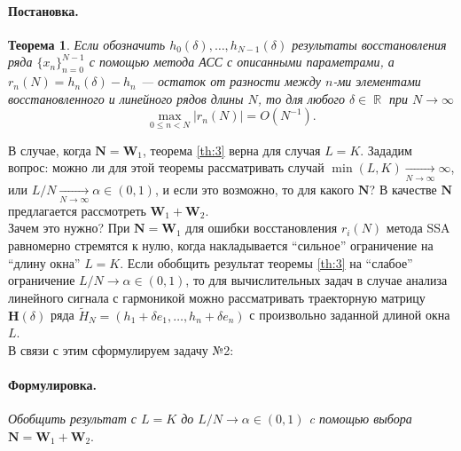 \documentclass[specialist,
substylefile = spbu_report.rtx,
subf,href,colorlinks=true, 12pt]{disser}
\DeclareMathOperator\R{\mathbb{R}}
\newtheorem{theorem}{Теорема}
\newenvironment{formulation}{\paragraph{Формулировка.}}{\hfill}
\newenvironment{statement}{\paragraph{Постановка.}}{\hfill}
\begin{document}
\begin{statement}
\begin{theorem}
			Если обозначить $h_0(\delta),\dots, h_{N-1}(\delta)$ результаты восстановления ряда $\{x_n\}^{N-1}_{n=0}$ с помощью метода АСС с описанными параметрами, а $r_n(N)=h_n(\delta)-h_n$ --- остаток от разности между $n$-ми элементами восстановленного и линейного рядов длины $N$, то для любого $\delta\in\R$ при $N\rightarrow\infty$
			\begin{equation*}
				\max_{0\leqslant n<N}|r_n(N)|=O(N^{-1}).
			\end{equation*}
		\end{theorem}
		В случае, когда $\mathbf{N} = \mathbf{W}_1$, теорема \eqref{th:3} верна для случая $L=K$. Зададим вопрос: можно ли для этой теоремы рассматривать случай $\min(L,K)\underset{N\rightarrow\infty}{\longrightarrow}\infty$, или $L/N\underset{N\rightarrow\infty}{\longrightarrow}\alpha\in(0,1)$, и если это возможно, то для какого $\mathbf{N}$? В качестве $\mathbf{N}$ предлагается рассмотреть $\mathbf{W}_1 + \mathbf{W}_2$. 
	\end{statement}
	\\
	Зачем это нужно? При $\mathbf{N} = \mathbf{W}_1$ для ошибки восстановления $r_i(N)$ метода SSA равномерно стремятся к нулю, когда накладывается ``сильное'' ограничение на ``длину окна'' $L = K$. Если обобщить результат теоремы \eqref{th:3} на ``слабое'' ограничение $L/N\rightarrow\alpha\in(0,1)$, то для вычислительных задач в случае анализа линейного сигнала с гармоникой можно рассматривать траекторную матрицу $\mathbf{H}(\delta)$ ряда $\widetilde{H}_N=(h_1 + \delta e_1, \dots, h_n+\delta e_n)$ с произвольно заданной длиной окна $L$.
	\\
	В связи с этим сформулируем задачу №2:
	\begin{formulation}
		\emph{Обобщить результат \cite{ZNekrutkin} с $L=K$ до $L/N\to \alpha \in (0,1)$ c помощью выбора $\mathbf{N}=\mathbf{W}_1+\mathbf{W}_2$}.
	\end{formulation}
\end{document}
